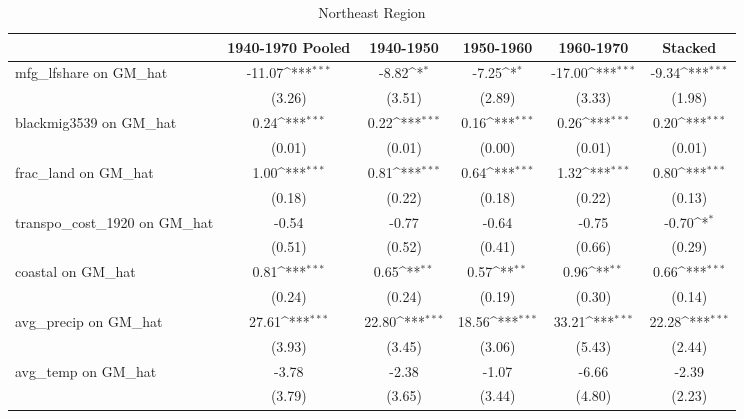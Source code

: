 \begin{table}[htbp]\centering
\def\sym#1{\ifmmode^{#1}\else\(^{#1}\)\fi}
\caption{Northeast Region}
\begin{tabular}{l*{5}{c}}
\toprule
                &\multicolumn{1}{c}{1940-1970 Pooled}&\multicolumn{1}{c}{1940-1950}&\multicolumn{1}{c}{1950-1960}&\multicolumn{1}{c}{1960-1970}&\multicolumn{1}{c}{Stacked}\\
\midrule
mfg\_lfshare on GM\_hat&   -11.07\sym{***}&    -8.82\sym{*}  &    -7.25\sym{*}  &   -17.00\sym{***}&    -9.34\sym{***}\\
                &   (3.26)         &   (3.51)         &   (2.89)         &   (3.33)         &   (1.98)         \\
\addlinespace
blackmig3539 on GM\_hat&     0.24\sym{***}&     0.22\sym{***}&     0.16\sym{***}&     0.26\sym{***}&     0.20\sym{***}\\
                &   (0.01)         &   (0.01)         &   (0.00)         &   (0.01)         &   (0.01)         \\
\addlinespace
frac\_land on GM\_hat&     1.00\sym{***}&     0.81\sym{***}&     0.64\sym{***}&     1.32\sym{***}&     0.80\sym{***}\\
                &   (0.18)         &   (0.22)         &   (0.18)         &   (0.22)         &   (0.13)         \\
\addlinespace
transpo\_cost\_1920 on GM\_hat&    -0.54         &    -0.77         &    -0.64         &    -0.75         &    -0.70\sym{*}  \\
                &   (0.51)         &   (0.52)         &   (0.41)         &   (0.66)         &   (0.29)         \\
\addlinespace
coastal on GM\_hat&     0.81\sym{***}&     0.65\sym{**} &     0.57\sym{**} &     0.96\sym{**} &     0.66\sym{***}\\
                &   (0.24)         &   (0.24)         &   (0.19)         &   (0.30)         &   (0.14)         \\
\addlinespace
avg\_precip on GM\_hat&    27.61\sym{***}&    22.80\sym{***}&    18.56\sym{***}&    33.21\sym{***}&    22.28\sym{***}\\
                &   (3.93)         &   (3.45)         &   (3.06)         &   (5.43)         &   (2.44)         \\
\addlinespace
avg\_temp on GM\_hat&    -3.78         &    -2.38         &    -1.07         &    -6.66         &    -2.39         \\
                &   (3.79)         &   (3.65)         &   (3.44)         &   (4.80)         &   (2.23)         \\

\end{tabular}
\end{table}
